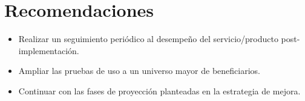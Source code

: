 \section*{Recomendaciones}
\begin{itemize}
    \item Realizar un seguimiento periódico al desempeño del servicio/producto post-implementación.
    \item Ampliar las pruebas de uso a un universo mayor de beneficiarios.
    \item Continuar con las fases de proyección planteadas en la estrategia de mejora.
\end{itemize}
